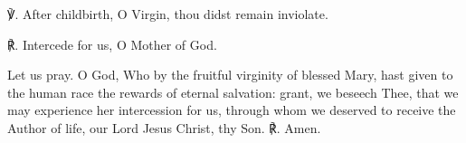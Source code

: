 \begin{otherlanguage}{english}


℣. After childbirth, O Virgin, thou didst remain inviolate.

℟. Intercede for us, O Mother of God.

Let us pray. O God, Who by the fruitful virginity of blessed Mary, hast given to the human race the rewards of eternal salvation: grant, we beseech Thee, that we may experience her intercession for us, through whom we deserved to receive the Author of life, our Lord Jesus Christ, thy Son. ℟. Amen.
\end{otherlanguage}